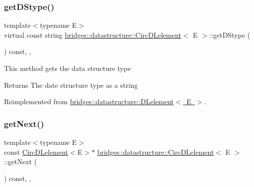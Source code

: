 \subsubsection{\texorpdfstring{get\+D\+Stype()}{getDStype()}}
{\footnotesize\ttfamily template$<$typename E$>$ \\
virtual const string \mbox{\hyperlink{classbridges_1_1datastructure_1_1_circ_d_lelement}{bridges\+::datastructure\+::\+Circ\+D\+Lelement}}$<$ E $>$\+::get\+D\+Stype (\begin{DoxyParamCaption}{ }\end{DoxyParamCaption}) const\hspace{0.3cm}{\ttfamily [inline]}, {\ttfamily [override]}, {\ttfamily [virtual]}}

This method gets the data structure type

\begin{DoxyReturn}{Returns}
The date structure type as a string 
\end{DoxyReturn}


Reimplemented from \mbox{\hyperlink{classbridges_1_1datastructure_1_1_d_lelement_a736ba8e6901608fb0ab04d781d2cceee}{bridges\+::datastructure\+::\+D\+Lelement$<$ E $>$}}.

\mbox{\label{classbridges_1_1datastructure_1_1_circ_d_lelement_a3b54f07ffa49151ed13d8b8df964a4ee}} 
\subsubsection{\texorpdfstring{get\+Next()}{getNext()}\hspace{0.1cm}{\footnotesize\ttfamily [1/2]}}
{\footnotesize\ttfamily template$<$typename E$>$ \\
const \mbox{\hyperlink{classbridges_1_1datastructure_1_1_circ_d_lelement}{Circ\+D\+Lelement}}$<$E$>$$\ast$ \mbox{\hyperlink{classbridges_1_1datastructure_1_1_circ_d_lelement}{bridges\+::datastructure\+::\+Circ\+D\+Lelement}}$<$ E $>$\+::get\+Next (\begin{DoxyParamCaption}{ }\end{DoxyParamCaption}) const\hspace{0.3cm}{\ttfamily [inline]}, {\ttfamily [override]}, {\ttfamily [virtual]}}

